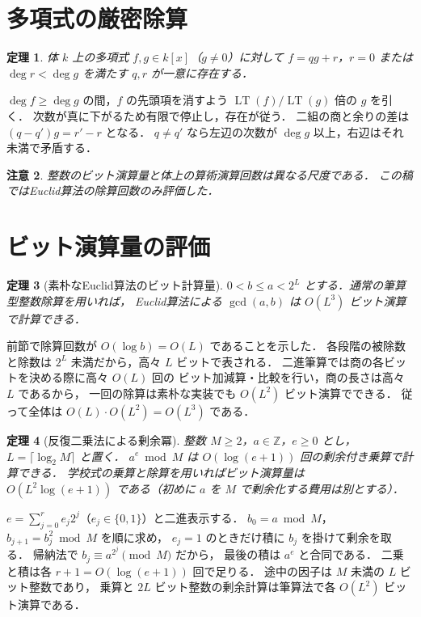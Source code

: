 \documentclass[a5paper,10pt,onecolumn]{jsarticle}
\makeatletter
\theoremstyle{mathnotetheorem}
\newtheorem{theorem}{定理}[section]
\newtheorem{remark}[theorem]{注意}
\renewcommand{\proofname}{証明}
\renewenvironment{proof}[1][\proofname]{%
  \par\pushQED{\qed}\normalfont\topsep4\p@\@plus2\p@\relax
  \trivlist\item[\hskip\labelsep\bfseries #1]\ignorespaces
}{\popQED\endtrivlist\@endpefalse}
\makeatother
\begin{document}
\section{多項式の厳密除算}
\begin{theorem}
体 $k$ 上の多項式 $f,g\in k[x]$（$g\ne0$）に対して
$f=qg+r$，$r=0$ または $\deg r<\deg g$ を満たす $q,r$ が一意に存在する．
\end{theorem}
\begin{proof}
$\deg f\ge\deg g$ の間，$f$ の先頭項を消すよう
$\operatorname{LT}(f)/\operatorname{LT}(g)$ 倍の $g$ を引く．
次数が真に下がるため有限で停止し，存在が従う．
二組の商と余りの差は $(q-q')g=r'-r$ となる．
$q\ne q'$ なら左辺の次数が $\deg g$ 以上，右辺はそれ未満で矛盾する．
\end{proof}
\begin{remark}
整数のビット演算量と体上の算術演算回数は異なる尺度である．
この稿ではEuclid算法の除算回数のみ評価した．
\end{remark}


\section{ビット演算量の評価}
\begin{theorem}[素朴なEuclid算法のビット計算量]
$0<b\le a<2^L$ とする．通常の筆算型整数除算を用いれば，
Euclid算法による $\gcd(a,b)$ は $O(L^3)$ ビット演算で計算できる．
\end{theorem}
\begin{proof}
前節で除算回数が $O(\log b)=O(L)$ であることを示した．
各段階の被除数と除数は $2^L$ 未満だから，高々 $L$ ビットで表される．
二進筆算では商の各ビットを決める際に高々 $O(L)$ 回の
ビット加減算・比較を行い，商の長さは高々 $L$ であるから，
一回の除算は素朴な実装でも $O(L^2)$ ビット演算でできる．
従って全体は $O(L)\cdot O(L^2)=O(L^3)$ である．
\end{proof}
\begin{theorem}[反復二乗法による剰余冪]
整数 $M\ge2$，$a\in\mathbb Z$，$e\ge0$ とし，
$L=\lceil\log_2M\rceil$ と置く．
$a^e\bmod M$ は $O(\log(e+1))$ 回の剰余付き乗算で計算できる．
学校式の乗算と除算を用いればビット演算量は
$O(L^2\log(e+1))$ である（初めに $a$ を $M$ で剰余化する費用は別とする）．
\end{theorem}
\begin{proof}
$e=\sum_{j=0}^r e_j2^j$（$e_j\in\{0,1\}$）と二進表示する．
$b_0=a\bmod M$，$b_{j+1}=b_j^2\bmod M$ を順に求め，
$e_j=1$ のときだけ積に $b_j$ を掛けて剰余を取る．
帰納法で $b_j\equiv a^{2^j}\pmod M$ だから，
最後の積は $a^e$ と合同である．
二乗と積は各 $r+1=O(\log(e+1))$ 回で足りる．
途中の因子は $M$ 未満の $L$ ビット整数であり，
乗算と $2L$ ビット整数の剰余計算は筆算法で各 $O(L^2)$ ビット演算である．
\end{proof}
\end{document}
